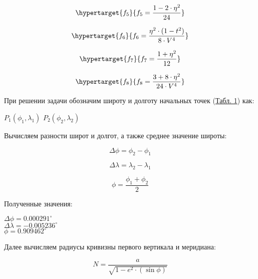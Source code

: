\documentclass[a4paper,14pt]{article}
\newcommand\indent[1][1cm]{\hspace*{#1}}
\begin{document}
\begin{equation}
    \hypertarget{f_5}{f_5 = \frac{1 - 2 \cdot \eta^2}{24}}
\end{equation}

\begin{equation}
    \hypertarget{f_6}{f_6 = \frac{\eta^2 \cdot (1 - t^2) }{8 \cdot V^4}}
\end{equation}

\begin{equation}
    \hypertarget{f_7}{f_7 = \frac{1 + \eta^2}{12}}
\end{equation}

\begin{equation}
    \hypertarget{f_8}{f_8 = \frac{3 + 8 \cdot \eta^2}{24 \cdot V^4}}
\end{equation}

\indent При решении задачи обозначим широту и долготу начальных точек (\hyperlink{table1}{Табл. 1}) как:

\begin{center}
    $P_1(\phi_1, \lambda_1)$ $P_2(\phi_2, \lambda_2)$\\
\end{center}

\indent Вычисляем разности широт и долгот, а также среднее значение широты:

\begin{equation}
    \Delta\phi = \phi_2 - \phi_1
\end{equation}

\begin{equation}
    \Delta\lambda = \lambda_2 - \lambda_1
\end{equation}

\begin{equation}
    \phi = \frac{\phi_1 + \phi_2}{2}
\end{equation}

\indent Полученные значения:

\begin{center}
    $\Delta\phi =0.000291^\circ$ \\
   $\Delta\lambda = -0.005236^\circ$ \\
   $\phi = 0.909462^\circ$\\
\end{center}

\indent Далее вычисляем радиусы кривизны первого вертикала и меридиана:

\begin{equation}
    N = \frac{a}{\sqrt{1 - e^2 \cdot (\sin{\phi})}}
\end{equation}
\end{document}
